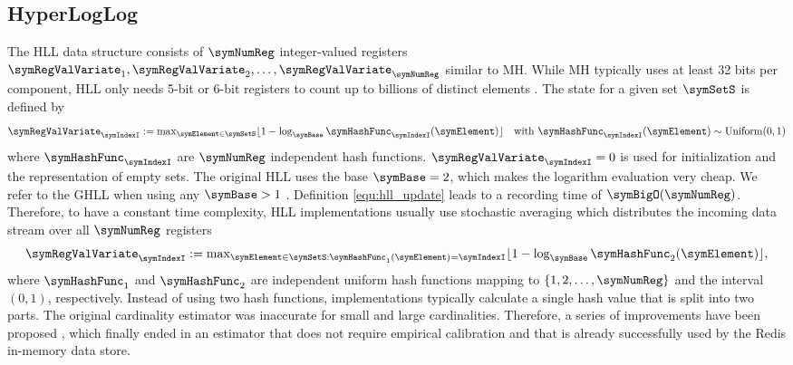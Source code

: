 \documentclass[sigconf, nonacm]{acmart}
\DeclareMathOperator*{\symUniform}{Uniform}
\begin{document}
\subsection{HyperLogLog}
\label{sec:intro_hyperloglog}
The \acf{HLL} data structure consists of $\symNumReg$ integer-valued registers $\symRegValVariate_1,\symRegValVariate_2,\ldots,\symRegValVariate_\symNumReg$ similar to \ac{MH}. While \ac{MH} typically uses at least 32 bits per component, \ac{HLL} only needs 5-bit or 6-bit registers to count up to billions of distinct elements \cite{Flajolet2007, Heule2013}.
The state for a given set $\symSetS$ is defined by
\begin{equation}
\label{equ:hll_update}
\textstyle\symRegValVariate_\symIndexI := \max_{\symElement\in\symSetS} \lfloor 1 - \log_\symBase \symHashFunc_\symIndexI(\symElement)\rfloor\quad\textnormal{with}\ \symHashFunc_\symIndexI(\symElement) \sim \symUniform(0,1)
\end{equation}
where $\symHashFunc_\symIndexI$ are $\symNumReg$ independent hash functions. $\symRegValVariate_\symIndexI=0$ is used for initialization and the representation of empty sets. The original \ac{HLL} uses the base $\symBase=2$, which makes the logarithm evaluation very cheap. We refer to the \acf{GHLL} when using any $\symBase>1$ \cite{Clifford2012, Pettie2020}. Definition \eqref{equ:hll_update} leads to a recording time of $\symBigO(\symNumReg)$. Therefore, to have a constant time complexity, \ac{HLL} implementations usually use stochastic averaging \cite{Flajolet2007} which distributes the incoming data stream over all $\symNumReg$ registers 
\begin{equation*}
\textstyle\symRegValVariate_\symIndexI := \max_{\symElement\in\symSetS:\symHashFunc_1(\symElement)=\symIndexI} \lfloor 1 - \log_\symBase \symHashFunc_2(\symElement)\rfloor,
\end{equation*}
where $\symHashFunc_1$ and $\symHashFunc_2$ are independent uniform hash functions mapping to $\lbrace 1, 2,\ldots,\symNumReg\rbrace$ and the interval $(0, 1)$, respectively. Instead of using two hash functions, implementations typically calculate a single hash value that is split into two parts. 
The original cardinality estimator \cite{Flajolet2007} was inaccurate for small and large cardinalities. 
Therefore, a series of improvements have been proposed \cite{Heule2013, YunxiangZhao2016, Qin2016}, which finally ended in an estimator that does not require empirical calibration \cite{Ertl2017, Ertl2017a} and that is already successfully used by the Redis in-memory data store.
\end{document}
